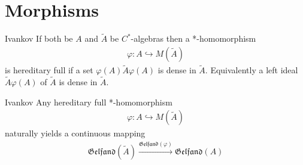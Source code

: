 \documentclass{beamer}
\theoremstyle{plain}
\newcommand{\bean}{\begin{eqnarray*}}
\newcommand{\eean}{\end{eqnarray*}}
\newcommand{\hookto}{\hookrightarrow}        %
\begin{document}
\section{Morphisms}
\begin{frame}
\begin{definition}\label{hereditary_extension_defn}\alert{Ivankov}
	If both be $A$ and $\widetilde{A}$ be $C^*$-algebras then  a *-homomorphism
	\bean
	\varphi: A \hookto M\left(\widetilde A\right)
	\eean
	is  \alert{hereditary full} if a set $\varphi\left( A\right) \widetilde{A} \varphi\left(A \right)$ is dense in  $\widetilde A$. Equivalently a left ideal $\widetilde{A} \varphi\left(A \right)$  of $\widetilde{A}$ is dense in $\widetilde{A}$.
\end{definition}



\begin{lemma}\label{lolale_lem}\alert{Ivankov}
	Any hereditary full  *-homomorphism 	
	\bean
	\varphi: A \hookto M\left(\widetilde A\right)
	\eean
	naturally yields a continuous mapping 
	\bean
	\mathfrak{Gelfand}\left(\widetilde A \right)\xrightarrow{\mathfrak{Gelfand}\left(\varphi \right)}\mathfrak{Gelfand}\left(A \right)
	\eean
\end{lemma}
\end{frame}
\end{document}
